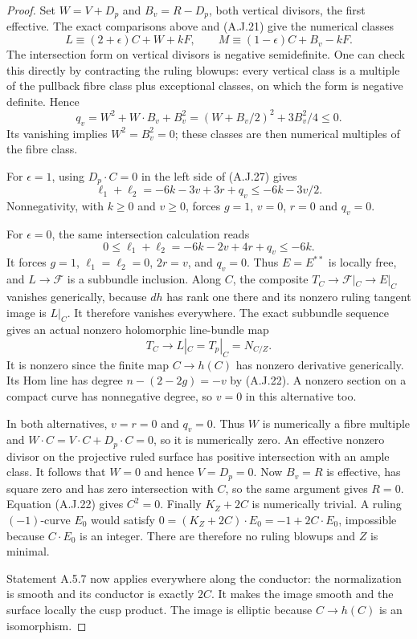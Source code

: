 \begin{proof}
Set $W=V+D_p$ and $B_v=R-D_p$, both vertical
divisors, the first effective. The exact comparisons
above and (A.J.21) give the numerical classes
\[
 L\equiv(2+\epsilon)C+W+kF,\qquad
 M\equiv(1-\epsilon)C+B_v-kF.
\]
The intersection form on vertical divisors is negative
semidefinite. One can check this directly by contracting
the ruling blowups: every vertical class is a multiple
of the pullback fibre class plus exceptional classes,
on which the form is negative definite. Hence
\[
 q_v=W^2+W\cdot B_v+B_v^2
      =(W+B_v/2)^2+3B_v^2/4\leq0.
\]
Its vanishing implies $W^2=B_v^2=0$; these classes
are then numerical multiples of the fibre class.

For $\epsilon=1$, using $D_p\cdot C=0$ in the
left side of (A.J.27) gives
\[
 \ell_1+\ell_2=-6k-3v+3r+q_v
                  \leq-6k-3v/2.
\]
Nonnegativity, with $k\geq0$ and $v\geq0$,
forces $g=1$, $v=0$, $r=0$ and $q_v=0$.

For $\epsilon=0$, the same intersection calculation reads
\[
 0\leq\ell_1+\ell_2
       =-6k-2v+4r+q_v\leq-6k.                   \tag{A.J.28}
\]
It forces $g=1$, $\ell_1=\ell_2=0$, $2r=v$,
and $q_v=0$.
Thus $E=E^{**}$ is locally free, and
$L\to\mathcal F$ is a subbundle inclusion.
Along $C$, the composite
$T_C\to\mathcal F|_C\to E|_C$ vanishes generically,
because $dh$ has rank one there and its nonzero ruling
tangent image is $L|_C$. It therefore vanishes
everywhere. The exact subbundle sequence gives an
actual nonzero holomorphic line-bundle map
\[
 T_C\longrightarrow L|_C=T_p|_C=N_{C/Z}.
                                                        \tag{A.J.29}
\]
It is nonzero since the finite map $C\to h(C)$ has
nonzero derivative generically. Its Hom line has degree
$n-(2-2g)=-v$ by (A.J.22). A nonzero section on a
compact curve has nonnegative degree, so $v=0$ in this
alternative too.

In both alternatives, $v=r=0$ and $q_v=0$.
Thus $W$ is numerically a fibre multiple and
$W\cdot C=V\cdot C+D_p\cdot C=0$, so it is
numerically zero. An effective nonzero divisor on the
projective ruled surface has positive intersection
with an ample class. It follows that $W=0$ and hence
$V=D_p=0$. Now $B_v=R$ is effective, has square zero
and has zero intersection with $C$, so the same
argument gives $R=0$. Equation (A.J.22) gives $C^2=0$.
Finally $K_Z+2C$ is numerically trivial. A ruling
$(-1)$-curve $E_0$ would satisfy
$0=(K_Z+2C)\cdot E_0=-1+2C\cdot E_0$, impossible
because $C\cdot E_0$ is an integer. There are therefore
no ruling blowups and $Z$ is minimal.

Statement A.5.7 now applies everywhere along
the conductor: the normalization is smooth and its
conductor is exactly $2C$. It makes the image smooth
and the surface locally the cusp product. The image is
elliptic because $C\to h(C)$ is an isomorphism.
\end{proof}
